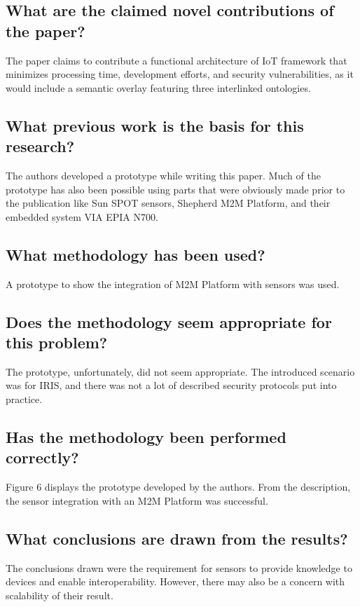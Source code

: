 \documentclass[11pt,a4paper]{article}
\begin{document}
\subsection*{What are the claimed novel contributions of the paper?}
The paper claims to contribute a functional architecture of IoT framework that minimizes processing time, development efforts, and security vulnerabilities, as it would include a semantic overlay featuring three interlinked ontologies. 

\subsection*{What previous work is the basis for this research?}
The authors developed a prototype while writing this paper. Much of the prototype has also been possible using parts that were obviously made prior to the publication like Sun SPOT sensors, Shepherd M2M Platform, and their embedded system VIA EPIA N700. 

\subsection*{What methodology has been used?}
A prototype to show the integration of M2M Platform with sensors was used. 

\subsection*{Does the methodology seem appropriate for this problem?}
The prototype, unfortunately, did not seem appropriate. The introduced scenario was for IRIS, and there was not a lot of described security protocols put into practice. 

\subsection*{Has the methodology been performed correctly?}
Figure 6 displays the prototype developed by the authors. From the description, the sensor integration with an M2M Platform was successful. 

\subsection*{What conclusions are drawn from the results?}
The conclusions drawn were the requirement for sensors to provide knowledge to devices and enable interoperability. However, there may also be a concern with scalability of their result. 
\end{document}
